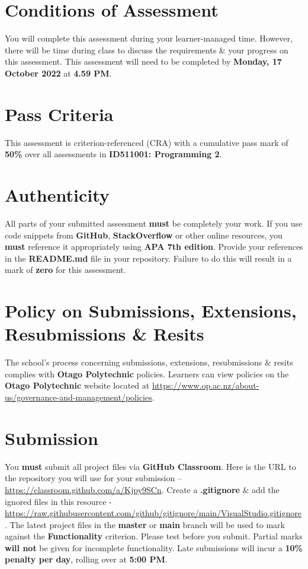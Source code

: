 \documentclass{article}
\begin{document}
\section*{Conditions of Assessment}
You will complete this assessment during your learner-managed time. However, there will be time during class to discuss the requirements \& your progress on this assessment. This assessment will need to be completed by \textbf{Monday, 17 October 2022} at \textbf{4.59 PM}.

\section*{Pass Criteria}
This assessment is criterion-referenced (CRA) with a cumulative pass mark of \textbf{50\%} over all assessments in \textbf{ID511001: Programming 2}.

\section*{Authenticity}
All parts of your submitted assessment \textbf{must} be completely your work. If you use code snippets from \textbf{GitHub}, \textbf{StackOverflow} or other online resources, you \textbf{must} reference it appropriately using \textbf{APA 7th edition}. Provide your references in the \textbf{README.md} file in your repository. Failure to do this will result in a mark of \textbf{zero} for this assessment.

\section*{Policy on Submissions, Extensions, Resubmissions \& Resits}
The school's process concerning submissions, extensions, resubmissions \& resits complies with \textbf{Otago Polytechnic} policies. Learners can view policies on the \textbf{Otago Polytechnic} website located at \href{https://www.op.ac.nz/about-us/governance-and-management/policies}{https://www.op.ac.nz/about-us/governance-and-management/policies}.

\section*{Submission}
You \textbf{must} submit all project files via \textbf{GitHub Classroom}. Here is the URL to the repository you will use for your submission – \href{https://classroom.github.com/a/Kjpy9SCn}{https://classroom.github.com/a/Kjpy9SCn}.  Create a \textbf{.gitignore} \& add the ignored files in this resource - \href{https://raw.githubusercontent.com/github/gitignore/main/VisualStudio.gitignore}{https://raw.githubusercontent.com/github/gitignore/main/VisualStudio.gitignore}. The latest project files in the \textbf{master} or \textbf{main} branch will be used to mark against the \textbf{Functionality} criterion. Please test before you submit. Partial marks \textbf{will not} be given for incomplete functionality. Late submissions will incur a \textbf{10\% penalty per day}, rolling over at \textbf{5:00 PM}.
\end{document}
